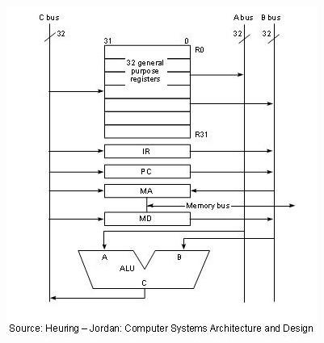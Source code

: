 \documentclass[12p,a4paper]{article}
\begin{document}
\begin{multicols}{2}
    \includegraphics[width=\columnwidth]{Figures/3bus_datapath.jpg}
    
    
    

\end{multicols}
\end{document}
